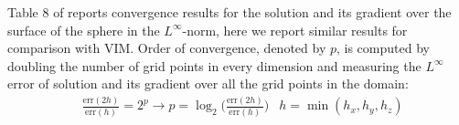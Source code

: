 \documentclass{elsarticle}
\begin{document}
Table 8 of \cite{guittet2015solving} reports convergence results for the solution and its gradient over the surface of the sphere in the $L^\infty$-norm, here we report similar results for comparison with VIM. Order of convergence, denoted by $p$, is computed by doubling the number of grid points in every dimension and measuring the $L^\infty$ error of solution and its gradient over all the grid points in the domain:
\begin{align*}
&\frac{\textrm{err}(2h)}{\textrm{err}(h)}=2^p \rightarrow p = \log_2\bigg(\frac{\textrm{err}(2h)}{\textrm{err}(h)}\bigg)  & h=\min(h_x,h_y,h_z)
\end{align*}


\end{document}
